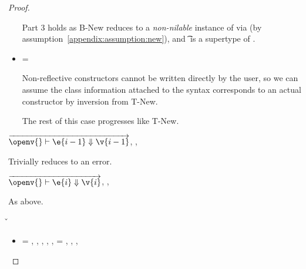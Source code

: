 \begin{lemma}
\begin{proof}
\begin{case}[B-New]
\begin{itemize}
\begin{subcase}[T-New]
Part 3 holds as B-New reduces to a \emph{non-nilable}
instance of \class{} via \newjavaliteral (by assumption~\ref{appendix:assumption:new}), 
and {\t{}} is a supertype of \javatotcexp{\classhint{}}.

\end{subcase}
\item[]
\begin{subcase}[T-NewStatic]
  {\ep{}} = { {\classhint{}}
                                                          {\class{}} {}}

  Non-reflective constructors cannot be written directly by the user, so we can assume
  the class information attached to the syntax corresponds to an actual constructor by inversion
  from T-New.

  The rest of this case progresses like T-New.
\end{subcase}
\end{itemize}
\end{case}

\begin{case}[BE-New1] $\overrightarrow{
  \opsem {\openv{}}
         {\e{i-1}}
         {\v{i-1}}
       }$,
  \opsem {\openv{}}
         {}
         {\errorvalv{}},
  \opsem {\openv{}} {\e{}} {\errorvalv{}}

        Trivially reduces to an error.

\end{case}

\begin{case}[BE-New2] 
  $\overrightarrow{
  \opsem {\openv{}}
         {\e{i}}
         {\v{i}}
       }$,
                  {}
                  {}
                  {\errorvalv{}},
        \opsem {\openv{}} {\e{}} {\errorvalv{}}

        As above.

\end{case}

\begin{case}[B-Field]
  \opsem {\openv{}}
         {} 
         { {\classfieldpair{\fld{}} {\v{}}}}

\begin{itemize}
  \item[]
\begin{subcase}[T-Field]
  \ep{} = {\fieldexp {\fld{}} {}},
  \judgementtworewrite {\propenv{}} {\ep{}} {\s{}} {\e{}},
  \issubtypein{}{\s{}}{\Object{}},
  ,
  ,
  \e{} = { {} {\fld{}} {}}
  ,
  \inpropenv{\topprop{}}{\thenprop{\prop{}}},
  \inpropenv{\topprop{}}{\elseprop{\prop{}}},
  \issubobjin{}{\emptyobject{}}{\object{}}



\end{subcase}
\end{itemize}
\end{case}
\end{proof}
\end{lemma}
